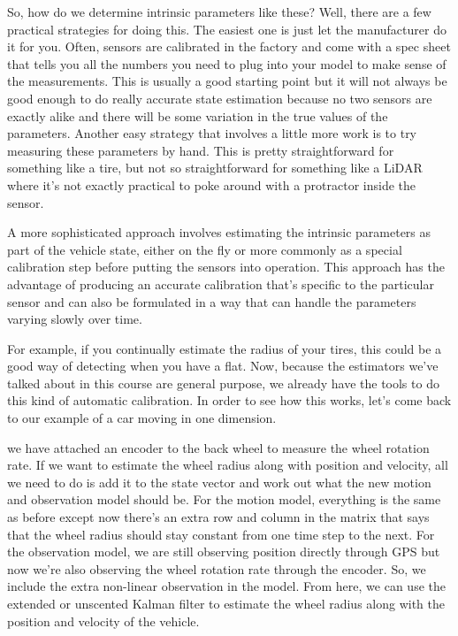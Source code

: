 So, how do we determine intrinsic parameters like these? Well, there are
a few practical strategies for doing this. The easiest one
is just let the manufacturer do it for you. Often, sensors
are calibrated in the factory and come with a spec sheet that tells you
all the numbers you need to plug into your model to make sense of the measurements. This is usually
a good starting point but it will not always
be good enough to do really accurate state estimation because no two sensors are exactly alike
and there will be some variation in the true values of the parameters. Another easy strategy
that involves a little more work is to try measuring these
parameters by hand. This is pretty straightforward for something like a tire, but not so straightforward for something like a LiDAR where it's not exactly
practical to poke around with a protractor
inside the sensor. 

A more sophisticated approach involves estimating the intrinsic
parameters as part of the vehicle state, either on the fly or more commonly as a special calibration step before putting the
sensors into operation. This approach has the advantage of producing an accurate
calibration that's specific to the particular sensor and can also be
formulated in a way that can handle the parameters varying slowly over time. 

For example, if you continually estimate the radius
of your tires, this could be a good way of detecting when
you have a flat. Now, because the estimators
we've talked about in this course are general purpose, we already have the tools to do this kind of automatic calibration. 
In order to see how this works, let's come back to our example of a car moving in one dimension. 

we have attached an encoder to the back wheel to measure the wheel
rotation rate. If we want to estimate the wheel radius along with position
and velocity, all we need to do is add it to the state vector and work out what
the new motion and observation model should be. For the motion model, everything is the same as before except now there's
an extra row and column in the matrix
that says that the wheel radius
should stay constant from one time step to the next. For the observation model, we are still
observing position directly through GPS but now we're
also observing the wheel rotation rate through the encoder. So, we include the extra non-linear observation
in the model. From here, we can use the extended or
unscented Kalman filter to estimate
the wheel radius along with the position and velocity of the vehicle. 

